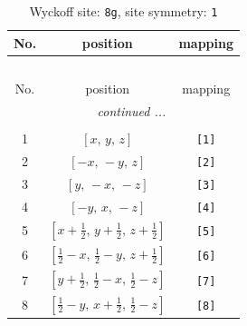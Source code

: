 \documentclass[fleqn,8pt]{jsarticle}
\begin{document}
\renewcommand{\arraystretch}{1.2}
\begin{longtable}{ccc}
\caption{Wyckoff site: {\tt 8g}, site symmetry: {\tt 1}}
 \\
 \hline \hline
No. & position & mapping \\ \hline \endfirsthead

\multicolumn{2}{l}{\tablename\ \thetable{}} \\
 \hline \hline
No. & position & mapping \\ \hline \endhead

 \hline \hline
\multicolumn{2}{r}{\footnotesize\it continued ...} \\ \endfoot

 \hline \hline
\multicolumn{2}{r}{} \\ \endlastfoot

1 & $\left[ x,\, y,\, z \right]$ & {\tt [1]} \\ \hline
2 & $\left[ - x,\, - y,\, z \right]$ & {\tt [2]} \\ \hline
3 & $\left[ y,\, - x,\, - z \right]$ & {\tt [3]} \\ \hline
4 & $\left[ - y,\, x,\, - z \right]$ & {\tt [4]} \\ \hline
5 & $\left[ x + \frac{1}{2},\, y + \frac{1}{2},\, z + \frac{1}{2} \right]$ & {\tt [5]} \\ \hline
6 & $\left[ \frac{1}{2} - x,\, \frac{1}{2} - y,\, z + \frac{1}{2} \right]$ & {\tt [6]} \\ \hline
7 & $\left[ y + \frac{1}{2},\, \frac{1}{2} - x,\, \frac{1}{2} - z \right]$ & {\tt [7]} \\ \hline
8 & $\left[ \frac{1}{2} - y,\, x + \frac{1}{2},\, \frac{1}{2} - z \right]$ & {\tt [8]} \\
\end{longtable}
\end{document}

